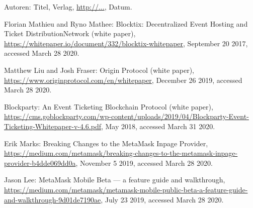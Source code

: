 \begin{thebibliography}{99}

 Autoren: Titel, Verlag, \url{http://...}, Datum.

 Florian Mathieu and Ryno Mathee: Blocktix: Decentralized Event Hosting and Ticket DistributionNetwork (white paper), \url{https://whitepaper.io/document/332/blocktix-whitepaper}, September 20 2017, accessed March 28 2020.


 Matthew Liu and Josh Fraser: Origin Protocol (white paper), \url{https://www.originprotocol.com/en/whitepaper}, December 26 2019, accessed March 28 2020.

 Blockparty: An Event Ticketing Blockchain Protocol (white paper), \url{https://cms.goblockparty.com/wp-content/uploads/2019/04/Blockparty-Event-Ticketing-Whitepaper-v-4.6.pdf}, May 2018, accessed March 31 2020.

 Erik Marks: Breaking Changes to the MetaMask Inpage Provider, \url{https://medium.com/metamask/breaking-changes-to-the-metamask-inpage-provider-b4dde069dd0a}, November 5 2019, accessed March 28 2020.

 Jason Lee: MetaMask Mobile Beta — a feature guide and walkthrough, \url{https://medium.com/metamask/metamask-mobile-public-beta-a-feature-guide-and-walkthrough-9d01de7190ae}, July 23 2019, accessed March 28 2020.



\end{thebibliography}

